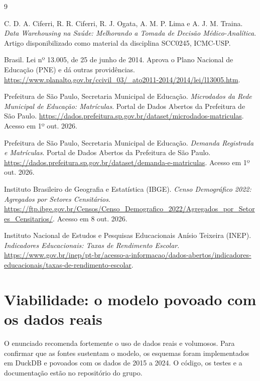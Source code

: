 \documentclass[11pt,a4paper]{article}
\begin{document}
\clearpage
\begin{thebibliography}{9}
\small
{} C. D. A. Ciferri, R. R. Ciferri, R. J. Ogata, A. M. P. Lima e A. J. M. Traina. \emph{Data Warehousing na Saúde: Melhorando a Tomada de Decisão Médico-Analítica}. Artigo disponibilizado como material da disciplina SCC0245, ICMC-USP.

 Brasil. Lei nº 13.005, de 25 de junho de 2014. Aprova o Plano Nacional de Educação (PNE) e dá outras providências. \url{https://www.planalto.gov.br/ccivil_03/_ato2011-2014/2014/lei/l13005.htm}.

 Prefeitura de São Paulo, Secretaria Municipal de Educação. \emph{Microdados da Rede Municipal de Educação: Matrículas}. Portal de Dados Abertos da Prefeitura de São Paulo. \url{https://dados.prefeitura.sp.gov.br/dataset/microdados-matriculas}. Acesso em 1º out. 2026.

 Prefeitura de São Paulo, Secretaria Municipal de Educação. \emph{Demanda Registrada e Matrículas}. Portal de Dados Abertos da Prefeitura de São Paulo. \url{https://dados.prefeitura.sp.gov.br/dataset/demanda-e-matriculas}. Acesso em 1º out. 2026.

 Instituto Brasileiro de Geografia e Estatística (IBGE). \emph{Censo Demográfico 2022: Agregados por Setores Censitários}. \url{https://ftp.ibge.gov.br/Censos/Censo_Demografico_2022/Agregados_por_Setores_Censitarios/}. Acesso em 8 out. 2026.

 Instituto Nacional de Estudos e Pesquisas Educacionais Anísio Teixeira (INEP). \emph{Indicadores Educacionais: Taxas de Rendimento Escolar}. \url{https://www.gov.br/inep/pt-br/acesso-a-informacao/dados-abertos/indicadores-educacionais/taxas-de-rendimento-escolar}.
\end{thebibliography}

\clearpage
\appendix
\section{Viabilidade: o modelo povoado com os dados reais}
\label{sec:apendice}

O enunciado recomenda fortemente o uso de dados reais e volumosos. Para confirmar que as fontes sustentam o modelo, os esquemas foram implementados em DuckDB e povoados com os dados de 2015 a 2024. O código, os testes e a documentação estão no repositório do grupo.
\end{document}
